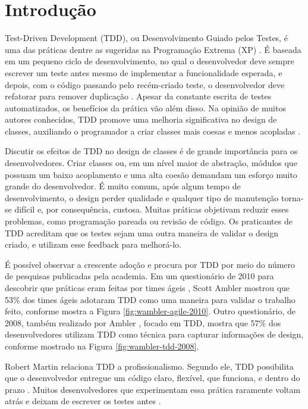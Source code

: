 \chapter{Introdução}
\label{cap:introducao}

Test-Driven Development (TDD), ou Desenvolvimento Guiado pelos Testes,
é uma das práticas dentre as sugeridas na Programação
Extrema (XP) \cite{XPExplained}. É baseada em um pequeno ciclo de
desenvolvimento, no qual o desenvolvedor deve sempre escrever um teste antes
mesmo de implementar a funcionalidade esperada, e depois, com o código
passando pelo recém-criado teste, o desenvolvedor deve refatorar para 
remover duplicação \cite{TDDByExample}.
Apesar da constante escrita de testes automatizados, os benefícios da
prática vão além disso. Na opinião de muitos autores conhecidos, TDD promove
uma melhoria significativa no design de classes, auxiliando o programador a
criar classes mais coesas e menos acopladas \cite{TDDByExample} \cite{GOOS} 
\cite{astels-tdd}.

Discutir os efeitos de TDD no design de classes é de grande importância para os
desenvolvedores.
Criar classes ou, em um nível maior de abstração, módulos que possuam um baixo
acoplamento e uma alta coesão demandam um esforço muito grande do desenvolvedor. 
É muito comum, após algum tempo de desenvolvimento, o design perder qualidade
e qualquer tipo de manutenção torna-se difícil e, por consequência, custosa.
Muitas práticas objetivam reduzir esses problemas, como programação pareada ou
revisão de código. Os praticantes de TDD acreditam que os testes sejam uma outra
maneira de validar o design criado, e utilizam esse feedback para melhorá-lo.

É possível observar a crescente adoção e procura por TDD
por meio do número de pesquisas publicadas pela academia.
Em um questionário de 2010 para descobrir que práticas eram feitas por times
ágeis \cite{wambler-survey-agile}, Scott Ambler mostrou que 53\% dos times ágeis
adotaram TDD como uma maneira para validar o trabalho feito, conforme mostra a 
Figura \ref{fig:wambler-agile-2010}. Outro questionário, de 2008, também realizado por Ambler
\cite{wambler-survey-tdd}, focado em TDD, mostra que 57\% dos desenvolvedores 
utilizam TDD como técnica para capturar informações de design, conforme mostrado
na Figura \ref{fig:wambler-tdd-2008}.

Robert Martin relaciona TDD a profissionalismo. Segundo ele, TDD possibilita que o desenvolvedor
entregue um código claro, flexível, que funciona, e dentro do prazo \cite{martin-profissionalismo}.
Muitos desenvolvedores que experimentam essa prática raramente voltam atrás e deixam
de escrever os testes antes \cite{tdd-fearless}. 

